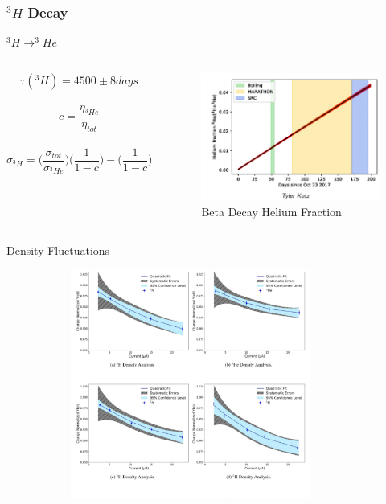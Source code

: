 \documentclass[12pt,usenames,dvipsnames]{beamer}
\begin{document}
\begin{frame}
\frametitle{$^3H $ Decay}
\begin{block}{$^3H \rightarrow ^3He$}
	\begin{columns}
		\begin{equation*}
		\tau(^3H) = 4500 \pm 8 days
		\end{equation*}		 	
		\\
		\begin{equation*}
		c = \frac{\eta_{^3He}} {\eta_{tot}}
		\end{equation*}
		\\
		\begin{equation*}
		\sigma_{^3H} = \big(\frac{\sigma_{tot}}{\sigma_{^3He}}\big) \big(\frac{1}{1-c}\big) -  \big(\frac{1}{1-c}\big)  
		\end{equation*}
		\begin{figure}
			\caption*{Beta Decay Helium Fraction}
			\includegraphics[width=6cm]{../images/beta_decay.png}
		\end{figure}
	\end{columns}
\end{block}
\end{frame}





\begin{frame}{Density Fluctuations}
	\vspace{-17pt}
	\begin{figure}
		\includegraphics[width=10cm,height=7.50cm]{../images/density_cor.pdf}
		\vspace{-0.5cm}
		\caption*{\cite{denscor}}
	\end{figure}

\end{frame}
\end{document}
